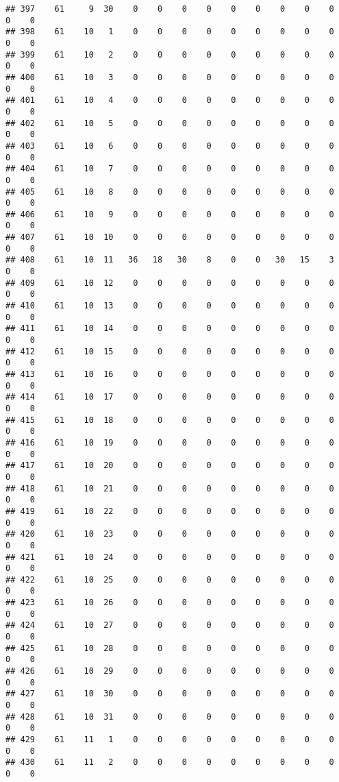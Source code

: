 \documentclass[]{article}
\begin{document}
\begin{verbatim}
## 397    61     9  30    0    0    0    0    0    0    0    0    0    0    0
## 398    61    10   1    0    0    0    0    0    0    0    0    0    0    0
## 399    61    10   2    0    0    0    0    0    0    0    0    0    0    0
## 400    61    10   3    0    0    0    0    0    0    0    0    0    0    0
## 401    61    10   4    0    0    0    0    0    0    0    0    0    0    0
## 402    61    10   5    0    0    0    0    0    0    0    0    0    0    0
## 403    61    10   6    0    0    0    0    0    0    0    0    0    0    0
## 404    61    10   7    0    0    0    0    0    0    0    0    0    0    0
## 405    61    10   8    0    0    0    0    0    0    0    0    0    0    0
## 406    61    10   9    0    0    0    0    0    0    0    0    0    0    0
## 407    61    10  10    0    0    0    0    0    0    0    0    0    0    0
## 408    61    10  11   36   18   30    8    0    0   30   15    3    0    0
## 409    61    10  12    0    0    0    0    0    0    0    0    0    0    0
## 410    61    10  13    0    0    0    0    0    0    0    0    0    0    0
## 411    61    10  14    0    0    0    0    0    0    0    0    0    0    0
## 412    61    10  15    0    0    0    0    0    0    0    0    0    0    0
## 413    61    10  16    0    0    0    0    0    0    0    0    0    0    0
## 414    61    10  17    0    0    0    0    0    0    0    0    0    0    0
## 415    61    10  18    0    0    0    0    0    0    0    0    0    0    0
## 416    61    10  19    0    0    0    0    0    0    0    0    0    0    0
## 417    61    10  20    0    0    0    0    0    0    0    0    0    0    0
## 418    61    10  21    0    0    0    0    0    0    0    0    0    0    0
## 419    61    10  22    0    0    0    0    0    0    0    0    0    0    0
## 420    61    10  23    0    0    0    0    0    0    0    0    0    0    0
## 421    61    10  24    0    0    0    0    0    0    0    0    0    0    0
## 422    61    10  25    0    0    0    0    0    0    0    0    0    0    0
## 423    61    10  26    0    0    0    0    0    0    0    0    0    0    0
## 424    61    10  27    0    0    0    0    0    0    0    0    0    0    0
## 425    61    10  28    0    0    0    0    0    0    0    0    0    0    0
## 426    61    10  29    0    0    0    0    0    0    0    0    0    0    0
## 427    61    10  30    0    0    0    0    0    0    0    0    0    0    0
## 428    61    10  31    0    0    0    0    0    0    0    0    0    0    0
## 429    61    11   1    0    0    0    0    0    0    0    0    0    0    0
## 430    61    11   2    0    0    0    0    0    0    0    0    0    0    0

\end{verbatim}
\end{document}
